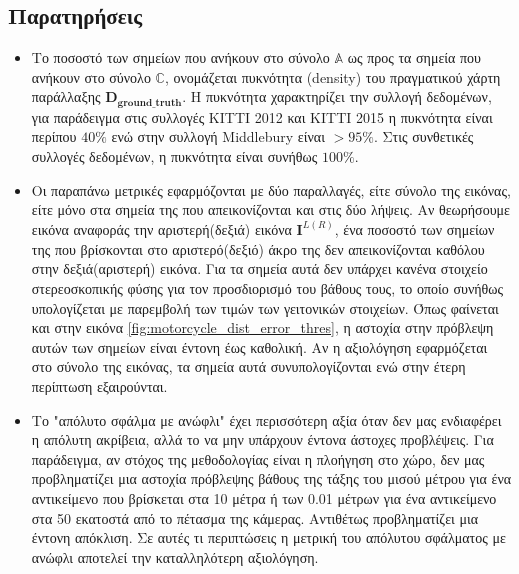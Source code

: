 \subsection{Παρατηρήσεις}

\begin{itemize}
	\item Το ποσοστό των σημείων που ανήκουν στο σύνολο $\mathbb{A}$ ως προς τα σημεία που ανήκουν στο σύνολο $\mathbb{C}$, ονομάζεται πυκνότητα \e (density) \g του πραγματικού χάρτη παράλλαξης $\mathbf{D}_{\mathbf{ground\_truth}}$. Η πυκνότητα χαρακτηρίζει την συλλογή δεδομένων, για παράδειγμα στις συλλογές \e KITTI 2012 \g και \e KITTI 2015 \g η πυκνότητα είναι περίπου $40\%$ ενώ στην συλλογή \e Middlebury \g είναι $>95\%$. Στις συνθετικές συλλογές δεδομένων, η πυκνότητα είναι συνήθως $100\%$.
	\item Οι παραπάνω μετρικές εφαρμόζονται με δύο παραλλαγές, είτε σύνολο της εικόνας, είτε μόνο στα σημεία της που απεικονίζονται και στις δύο λήψεις. Αν θεωρήσουμε εικόνα αναφοράς την αριστερή(δεξιά) εικόνα $\mathbf{I}^{L(R)}$, ένα ποσοστό των σημείων της που βρίσκονται στο αριστερό(δεξιό) άκρο της δεν απεικονίζονται καθόλου στην δεξιά(αριστερή) εικόνα. Για τα σημεία αυτά δεν υπάρχει κανένα στοιχείο στερεοσκοπικής φύσης για τον προσδιορισμό του βάθους τους, το οποίο συνήθως υπολογίζεται με παρεμβολή των τιμών των γειτονικών στοιχείων. Όπως φαίνεται και στην εικόνα \ref{fig:motorcycle_dist_error_thres}, η αστοχία στην πρόβλεψη αυτών των σημείων είναι έντονη έως καθολική. Αν η αξιολόγηση εφαρμόζεται στο σύνολο της εικόνας, τα σημεία αυτά συνυπολογίζονται ενώ στην έτερη περίπτωση εξαιρούνται.
	\item Το "απόλυτο σφάλμα με ανώφλι" έχει περισσότερη αξία όταν δεν μας ενδιαφέρει η απόλυτη ακρίβεια, αλλά το να μην υπάρχουν έντονα άστοχες προβλέψεις. Για παράδειγμα, αν στόχος της μεθοδολογίας είναι η πλοήγηση στο χώρο, δεν μας προβληματίζει μια αστοχία πρόβλεψης βάθους της τάξης του μισού μέτρου για ένα αντικείμενο που βρίσκεται στα 10 μέτρα ή των 0.01 μέτρων για ένα αντικείμενο στα 50 εκατοστά από το πέτασμα της κάμερας. Αντιθέτως προβληματίζει μια έντονη απόκλιση. Σε αυτές τι περιπτώσεις η μετρική του απόλυτου σφάλματος με ανώφλι αποτελεί την καταλληλότερη αξιολόγηση. 

\end{itemize}
